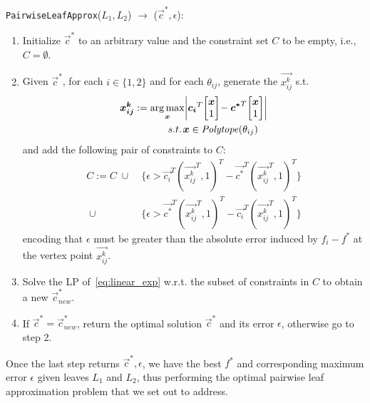 \vspace{1mm}
\noindent \texttt{PairwiseLeafApprox}($L_1,L_2$) $\longrightarrow$ ($\vec{c}^*,\epsilon$):
\vspace{-2mm}
\begin{enumerate}
\item Initialize $\vec{c}^*$ to an arbitrary value and the constraint set $C$
to be empty, i.e., $C = \emptyset$.
\item Given $\vec{c}^*$, for each $i \in \{ 1,2\}$ and for each $\theta_{ij}$, generate the $\vec{x_{ij}^k}$ s.t.
\begin{align*}
\vec{x_{ij}^k} := \argmax_{\vec{x}} \! & \left| \vec{c_i}^T \! \mb \vec{x}\\1 \me \! - \vec{c^*}^T \! \mb \vec{x}\\1 \me \right| \\ 
  s.t. \;              \! & \vec{x} \in \PT(\theta_{ij})
\end{align*}
and add the following pair of constraints to $C$:
\begin{align*}
  C := C \; \cup \; & \{ \epsilon > \vec{c_i}^T ({\vec{x_{ij}^k}}^T,1)^T - \vec{c^*}^T ({\vec{x_{ij}^k}}^T,1)^T \} \\
         \; \cup \; & \{ \epsilon > \vec{c^*}^T ({\vec{x_{ij}^k}}^T,1)^T - \vec{c_i}^T ({\vec{x_{ij}^k}}^T,1)^T \}
\end{align*}
encoding that $\epsilon$ must be greater than the absolute error induced
by $f_i - f^*$ at the vertex point $\vec{x_{ij}^k}$.  
\item Solve the LP of~\eqref{eq:linear_exp} w.r.t. the subset of constraints in $C$ to obtain a new $\vec{c}^*_{\mathit{new}}$.
\item If $\vec{c}^* = \vec{c}^*_{\mathit{new}}$, return the optimal solution $\vec{c}^*$ and its error $\epsilon$, otherwise go to step 2.
\end{enumerate}
Once the last step returns $\vec{c}^*,\epsilon$, we have the best $f^*$ and corresponding
maximum error $\epsilon$ given leaves $L_1$ and $L_2$, thus performing the optimal pairwise
leaf approximation problem that we set out to address.


